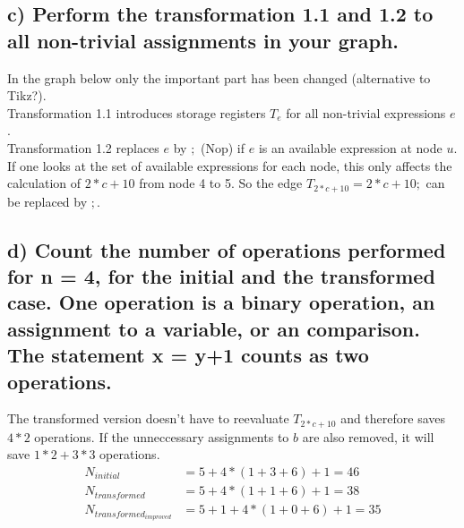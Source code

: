 \documentclass[11pt,a4paper]{scrartcl}
\begin{document}
\subsection*{c) Perform the transformation 1.1 and 1.2 to all non-trivial assignments in your graph.}
In the graph below only the important part has been changed (alternative to Tikz?).\\
Transformation 1.1 introduces storage registers $T_e$ for all non-trivial expressions $e$.\\
Transformation 1.2 replaces $e$ by $;$ (Nop) if $e$ is an available expression at node $u$.
If one looks at the set of available expressions for each node, this only affects the calculation of $2*c+10$ from node 4 to 5. So the edge $T_{2*c + 10} = 2*c + 10;$ can be replaced by $;$.


\subsection*{d) Count the number of operations performed for n = 4, for the initial and the transformed case. One operation is a binary operation, an assignment to a variable, or an comparison. The statement x = y+1 counts as two operations.}
The transformed version doesn't have to reevaluate $T_{2*c + 10}$ and therefore saves $4*2$ operations.
If the unneccessary assignments to $b$ are also removed, it will save $1*2+3*3$ operations.
\begin{align*}
N_{initial} &= 5+4*(1+3+6)+1 = 46\\
N_{transformed} &= 5+4*(1+1+6)+1 = 38\\
N_{transformed_{improved}} &= 5+1+4*(1+0+6)+1 = 35
\end{align*}
\end{document}

